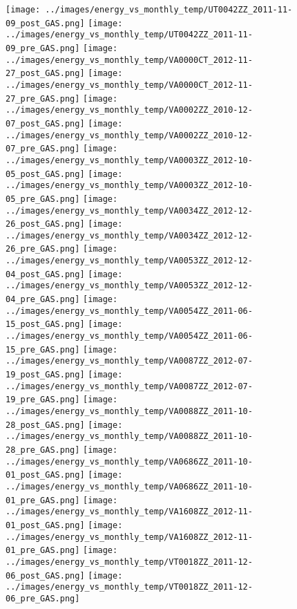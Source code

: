 \clearpage
\begin{figure}
\centering
\texttt{[image: ../images/energy\_vs\_monthly\_temp/UT0042ZZ\_2011-11-09\_post\_GAS.png]}
\texttt{[image: ../images/energy\_vs\_monthly\_temp/UT0042ZZ\_2011-11-09\_pre\_GAS.png]}
\texttt{[image: ../images/energy\_vs\_monthly\_temp/VA0000CT\_2012-11-27\_post\_GAS.png]}
\texttt{[image: ../images/energy\_vs\_monthly\_temp/VA0000CT\_2012-11-27\_pre\_GAS.png]}
\texttt{[image: ../images/energy\_vs\_monthly\_temp/VA0002ZZ\_2010-12-07\_post\_GAS.png]}
\texttt{[image: ../images/energy\_vs\_monthly\_temp/VA0002ZZ\_2010-12-07\_pre\_GAS.png]}
\texttt{[image: ../images/energy\_vs\_monthly\_temp/VA0003ZZ\_2012-10-05\_post\_GAS.png]}
\texttt{[image: ../images/energy\_vs\_monthly\_temp/VA0003ZZ\_2012-10-05\_pre\_GAS.png]}
\texttt{[image: ../images/energy\_vs\_monthly\_temp/VA0034ZZ\_2012-12-26\_post\_GAS.png]}
\texttt{[image: ../images/energy\_vs\_monthly\_temp/VA0034ZZ\_2012-12-26\_pre\_GAS.png]}
\texttt{[image: ../images/energy\_vs\_monthly\_temp/VA0053ZZ\_2012-12-04\_post\_GAS.png]}
\texttt{[image: ../images/energy\_vs\_monthly\_temp/VA0053ZZ\_2012-12-04\_pre\_GAS.png]}
\texttt{[image: ../images/energy\_vs\_monthly\_temp/VA0054ZZ\_2011-06-15\_post\_GAS.png]}
\texttt{[image: ../images/energy\_vs\_monthly\_temp/VA0054ZZ\_2011-06-15\_pre\_GAS.png]}
\texttt{[image: ../images/energy\_vs\_monthly\_temp/VA0087ZZ\_2012-07-19\_post\_GAS.png]}
\texttt{[image: ../images/energy\_vs\_monthly\_temp/VA0087ZZ\_2012-07-19\_pre\_GAS.png]}
\texttt{[image: ../images/energy\_vs\_monthly\_temp/VA0088ZZ\_2011-10-28\_post\_GAS.png]}
\texttt{[image: ../images/energy\_vs\_monthly\_temp/VA0088ZZ\_2011-10-28\_pre\_GAS.png]}
\texttt{[image: ../images/energy\_vs\_monthly\_temp/VA0686ZZ\_2011-10-01\_post\_GAS.png]}
\texttt{[image: ../images/energy\_vs\_monthly\_temp/VA0686ZZ\_2011-10-01\_pre\_GAS.png]}
\texttt{[image: ../images/energy\_vs\_monthly\_temp/VA1608ZZ\_2012-11-01\_post\_GAS.png]}
\texttt{[image: ../images/energy\_vs\_monthly\_temp/VA1608ZZ\_2012-11-01\_pre\_GAS.png]}
\texttt{[image: ../images/energy\_vs\_monthly\_temp/VT0018ZZ\_2011-12-06\_post\_GAS.png]}
\texttt{[image: ../images/energy\_vs\_monthly\_temp/VT0018ZZ\_2011-12-06\_pre\_GAS.png]}
\end{figure}
